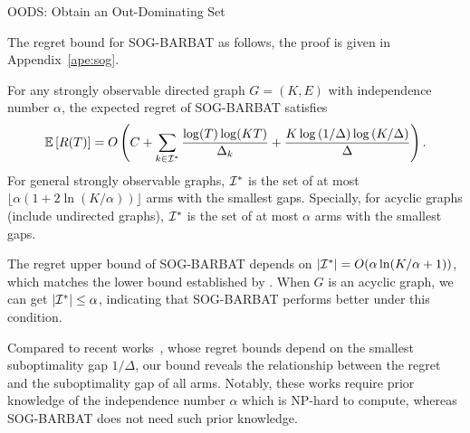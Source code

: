 \begin{algorithm}[t]
    \LinesNumbered
    \SetAlgoLined
    \caption{OODS: Obtain an Out-Dominating Set}
    \label{algs:OODS}
\end{algorithm}
The regret bound for SOG-BARBAT as follows, the proof is given in Appendix~\ref{ape:sog}.
\begin{theorem}\label{the:sog-erb}
For any strongly observable directed graph $G = (K, E)$ with independence number $\alpha$, the expected regret of SOG-BARBAT satisfies
\[
    {\mathbb{E}}\left[R(T)\right] = O\left(C + 
      \sum_{k\in {\mathcal{I}}^*}
        \frac{\log(T)\log(KT)}{\Delta_k}
      +
      \frac{K\log\left(1/\Delta\right)\log\left(K/\Delta\right)}{\Delta}
    \right).
\]
For general strongly observable graphs, ${\mathcal{I}}^*$ is the set of at most $\lfloor \alpha(1 + 2\ln(K/\alpha)) \rfloor$ arms with the smallest gaps. Specially, for acyclic graphs (include undirected graphs), ${\mathcal{I}}^*$ is the set of at most $\alpha$ arms with the smallest gaps.
\end{theorem}
\begin{remark}
    The regret upper bound of SOG-BARBAT depends on $|{\mathcal{I}}^*| = O(\alpha\ln(K/\alpha + 1))$, which matches the lower bound established by \cite{chen2023interpolating}. When $G$ is an acyclic graph, we can get $|{\mathcal{I}}^*| \leq \alpha$, indicating that SOG-BARBAT performs better under this  condition.
    
    Compared to recent works~\citep{ito2022nearly,dann2023blackbox}, whose regret bounds depend on the smallest suboptimality gap $1/\Delta$, our bound reveals the relationship between the regret and the suboptimality gap of all arms. Notably, these works require prior knowledge of the independence number $\alpha$ which is NP-hard to compute, whereas SOG-BARBAT does not need such prior knowledge. %
\end{remark}
